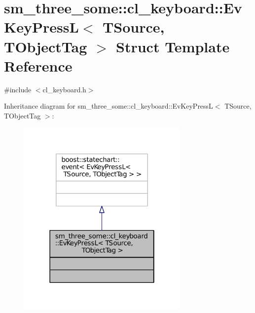 \hypertarget{structsm__three__some_1_1cl__keyboard_1_1EvKeyPressL}{}\section{sm\+\_\+three\+\_\+some\+:\+:cl\+\_\+keyboard\+:\+:Ev\+Key\+PressL$<$ T\+Source, T\+Object\+Tag $>$ Struct Template Reference}
\label{structsm__three__some_1_1cl__keyboard_1_1EvKeyPressL}


{\ttfamily \#include $<$cl\+\_\+keyboard.\+h$>$}



Inheritance diagram for sm\+\_\+three\+\_\+some\+:\+:cl\+\_\+keyboard\+:\+:Ev\+Key\+PressL$<$ T\+Source, T\+Object\+Tag $>$\+:
\nopagebreak
\begin{figure}[H]
\begin{center}
\leavevmode
\includegraphics[width=238pt]{structsm__three__some_1_1cl__keyboard_1_1EvKeyPressL__inherit__graph}
\end{center}
\end{figure}


